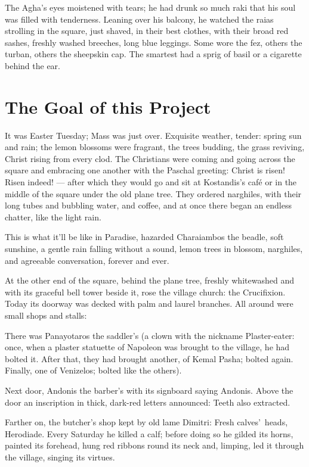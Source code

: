 \documentclass[diploma]{softlab-thesis}
\begin{document}
The Agha’s eyes moistened with tears; he had drunk so much raki that his
soul was filled with tenderness. Leaning over his balcony, he watched the
raias strolling in the square, just shaved, in their best clothes, with
their broad red sashes, freshly washed breeches, long blue leggings. Some
wore the fez, others the turban, others the sheepskin cap. The smartest had
a sprig of basil or a cigarette behind the ear.


\section{The Goal of this Project}

It was Easter Tuesday; Mass was just over. Exquisite weather, tender: spring
sun and rain; the lemon blossoms were fragrant, the trees budding, the grass
reviving, Christ rising from every clod. The Christians were coming and
going across the square and embracing one another with the Paschal greeting:
Christ is risen! Risen indeed! --- after which they would go and sit at
Kostandis’s café or in the middle of the square under the old plane
tree. They ordered narghiles, with their long tubes and bubbling water, and
coffee, and at once there began an endless chatter, like the light rain.

This is what it’ll be like in Paradise, hazarded Charaiambos the beadle,
soft sunshine, a gentle rain falling without a sound, lemon trees in
blossom, narghiles, and agreeable conversation, forever and ever.

At the other end of the square, behind the plane tree, freshly whitewashed
and with its graceful bell tower beside it, rose the village church: the
Crucifixion. Today its doorway was decked with palm and laurel branches. All
around were small shops and stalls:

There was Panayotaros the saddler’s (a clown with the nickname
Plaster-eater: once, when a plaster statuette of Napoleon was brought to the
village, he had bolted it. After that, they had brought another, of Kemal
Pasha; bolted again. Finally, one of Venizelos; bolted like the others).

Next door, Andonis the barber’s with its signboard saying Andonis. Above the
door an inscription in thick, dark-red letters announced: Teeth also
extracted.

Farther on, the butcher’s shop kept by old lame Dimitri: Fresh
calves’~heads, Herodiade. Every Saturday he killed a calf; before doing so
he gilded its horns, painted its forehead, hung red ribbons round its neck
and, limping, led it through the village, singing its virtues.
\end{document}
